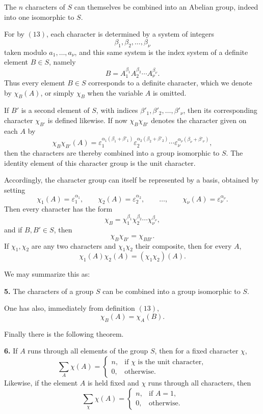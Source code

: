 \documentclass[11pt]{article}
\begin{document}
The \(n\) characters of \(S\) can themselves be combined into an Abelian group, indeed into one isomorphic to \(S\).

For by \((13)\), each character is determined by a system of integers
\[
\beta_1,\beta_2,\dots,\beta_\nu
\]
taken modulo \(a_1,\dots,a_\nu\), and this same system is the index system of a definite element \(B\in S\), namely
\[
B=A_1^{\beta_1}A_2^{\beta_2}\cdots A_\nu^{\beta_\nu}.
\tag{14}
\]
Thus every element \(B\in S\) corresponds to a definite character, which we denote by \(\chi_B(A)\), or simply \(\chi_B\) when the variable \(A\) is omitted.

If \(B'\) is a second element of \(S\), with indices \(\beta'_1,\beta'_2,\dots,\beta'_\nu\), then its corresponding character \(\chi_{B'}\) is defined likewise. If now \(\chi_B\chi_{B'}\) denotes the character given on each \(A\) by
\[
\chi_B\chi_{B'}(A)
=
\varepsilon_1^{\alpha_1(\beta_1+\beta'_1)}
\varepsilon_2^{\alpha_2(\beta_2+\beta'_2)}
\cdots
\varepsilon_\nu^{\alpha_\nu(\beta_\nu+\beta'_\nu)},
\tag{15}
\]
then the characters are thereby combined into a group isomorphic to \(S\). The identity element of this character group is the unit character.

Accordingly, the character group can itself be represented by a basis, obtained by setting
\[
\chi_1(A)=\varepsilon_1^{\alpha_1},\qquad
\chi_2(A)=\varepsilon_2^{\alpha_2},\qquad
\dots,\qquad
\chi_\nu(A)=\varepsilon_\nu^{\alpha_\nu}.
\tag{16}
\]
Then every character has the form
\[
\chi_B = \chi_1^{\beta_1}\chi_2^{\beta_2}\cdots \chi_\nu^{\beta_\nu},
\tag{17}
\]
and if \(B,B'\in S\), then
\[
\chi_B\chi_{B'}=\chi_{BB'}.
\tag{18}
\]
If \(\chi_1,\chi_2\) are any two characters and \(\chi_1\chi_2\) their composite, then for every \(A\),
\[
\chi_1(A)\chi_2(A) = (\chi_1\chi_2)(A).
\tag{19}
\]

We may summarize this as:

\medskip
\noindent\textbf{5.} The characters of a group \(S\) can be combined into a group isomorphic to \(S\).

\medskip
One has also, immediately from definition \((13)\),
\[
\chi_B(A)=\chi_A(B).
\tag{20}
\]

Finally there is the following theorem.

\medskip
\noindent\textbf{6.} If \(A\) runs through all elements of the group \(S\), then for a fixed character \(\chi\),
\[
\sum_A \chi(A)=
\begin{cases}
n,& \text{if }\chi\text{ is the unit character},\\[4pt]
0,& \text{otherwise}.
\end{cases}
\tag{21}
\]
Likewise, if the element \(A\) is held fixed and \(\chi\) runs through all characters, then
\[
\sum_\chi \chi(A)=
\begin{cases}
n,& \text{if }A=1,\\[4pt]
0,& \text{otherwise}.
\end{cases}
\tag{22}
\]
\end{document}
